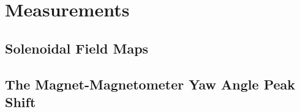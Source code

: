 \chapter{Measurements}
\section{Solenoidal Field Maps}
\section{The Magnet-Magnetometer Yaw Angle Peak Shift}